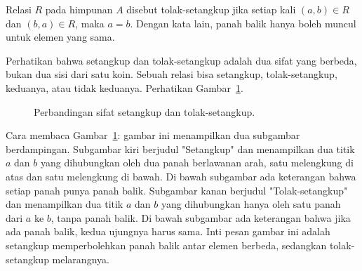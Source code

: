 \documentclass[11pt,a4paper]{article}
\begin{document}
Relasi $R$ pada himpunan $A$ disebut tolak-setangkup jika setiap kali $(a,b) \in R$ dan $(b,a) \in R$, maka $a=b$. Dengan kata lain, panah balik hanya boleh muncul untuk elemen yang sama.

Perhatikan bahwa setangkup dan tolak-setangkup adalah dua sifat yang berbeda, bukan dua sisi dari satu koin. Sebuah relasi bisa setangkup, tolak-setangkup, keduanya, atau tidak keduanya. Perhatikan Gambar~\ref{fig:setangkup}.

\begin{figure}[H]
	\centering
	\caption{Perbandingan sifat setangkup dan tolak-setangkup.}
	\label{fig:setangkup}
\end{figure}

Cara membaca Gambar~\ref{fig:setangkup}: gambar ini menampilkan dua subgambar berdampingan. Subgambar kiri berjudul "Setangkup" dan menampilkan dua titik $a$ dan $b$ yang dihubungkan oleh dua panah berlawanan arah, satu melengkung di atas dan satu melengkung di bawah. Di bawah subgambar ada keterangan bahwa setiap panah punya panah balik. Subgambar kanan berjudul "Tolak-setangkup" dan menampilkan dua titik $a$ dan $b$ yang dihubungkan hanya oleh satu panah dari $a$ ke $b$, tanpa panah balik. Di bawah subgambar ada keterangan bahwa jika ada panah balik, kedua ujungnya harus sama. Inti pesan gambar ini adalah setangkup memperbolehkan panah balik antar elemen berbeda, sedangkan tolak-setangkup melarangnya.
\end{document}
